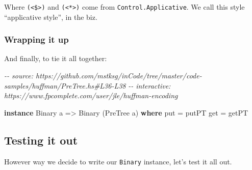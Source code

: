 \documentclass[]{article}
\newenvironment{Shaded}{}{}
\newcommand{\CommentTok}[1]{\textcolor[rgb]{0.38,0.63,0.69}{\textit{#1}}}
\newcommand{\DataTypeTok}[1]{\textcolor[rgb]{0.56,0.13,0.00}{#1}}
\newcommand{\KeywordTok}[1]{\textcolor[rgb]{0.00,0.44,0.13}{\textbf{#1}}}
\newcommand{\NormalTok}[1]{#1}
\newcommand{\OtherTok}[1]{\textcolor[rgb]{0.00,0.44,0.13}{#1}}
\begin{document}
Where \texttt{(\textless{}\$\textgreater{})} and
\texttt{(\textless{}*\textgreater{})} come from \texttt{Control.Applicative}. We
call this style ``applicative style'', in the biz.

\subsubsection{Wrapping it up}\label{wrapping-it-up}

And finally, to tie it all together:

\begin{Shaded}
\begin{Highlighting}[]
\CommentTok{{-}{-} source: https://github.com/mstksg/inCode/tree/master/code{-}samples/huffman/PreTree.hs\#L36{-}L38}
\CommentTok{{-}{-} interactive: https://www.fpcomplete.com/user/jle/huffman{-}encoding}

\KeywordTok{instance} \DataTypeTok{Binary}\NormalTok{ a }\OtherTok{=\textgreater{}} \DataTypeTok{Binary}\NormalTok{ (}\DataTypeTok{PreTree}\NormalTok{ a) }\KeywordTok{where}
\NormalTok{    put }\OtherTok{=}\NormalTok{ putPT}
\NormalTok{    get }\OtherTok{=}\NormalTok{ getPT}
\end{Highlighting}
\end{Shaded}

\subsection{Testing it out}\label{testing-it-out}

However way we decide to write our \texttt{Binary} instance, let's test it all
out.
\end{document}
